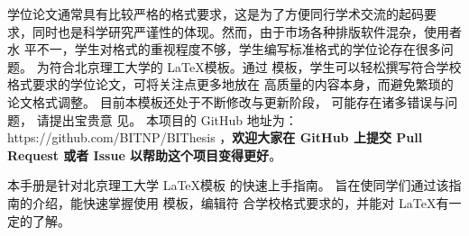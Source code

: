 \begin{conclusion}


学位论文通常具有比较严格的格式要求，这是为了方便同行学术交流的起码要
求，同时也是科学研究严谨性的体现。然而，由于市场各种排版软件混杂，使用者水
平不一，学生对格式的重视程度不够，学生编写标准格式的学位论存在很多问题。
\BIThesis 为符合北京理工大学的 \LaTeX 模板。通过 \BIThesis 模板，学生可以轻松撰写符合学校格式要求的学位论文，可将关注点更多地放在
高质量的内容本身，而避免繁琐的论文格式调整。
目前本模板还处于不断修改与更新阶段，
可能存在诸多错误与问题，
请提出宝贵意
见。
本项目的 GitHub 地址为：
https://github.com/BITNP/BIThesis ，\textbf{欢迎大家在 GitHub 上提交
Pull Request 或者 Issue 以帮助这个项目变得更好}。

本手册是针对北京理工大学 \LaTeX 模板 \BIThesis 的快速上手指南。
旨在使同学们通过该指南的介绍，能快速掌握使用 \BIThesis 模板，编辑符
合学校格式要求的，并能对 \LaTeX 有一定的了解。
  
\end{conclusion}
